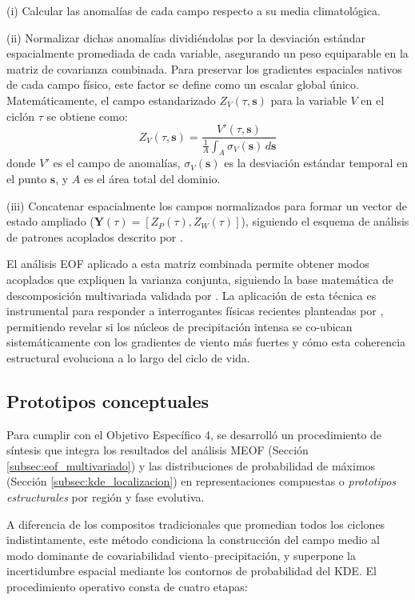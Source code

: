 (i) Calcular las anomalías de cada campo respecto a su media climatológica.

(ii) Normalizar dichas anomalías dividiéndolas por la desviación estándar espacialmente promediada de cada variable, asegurando un peso equiparable en la matriz de covarianza combinada. Para preservar los gradientes espaciales nativos de cada campo físico, este factor se define como un escalar global único. Matemáticamente, el campo estandarizado $Z_{V}(\tau, \mathbf{s})$ para la variable $V$ en el ciclón $\tau$ se obtiene como:
\begin{equation}
    Z_{V}(\tau, \mathbf{s}) = \frac{V'(\tau, \mathbf{s})}{\frac{1}{A}\int_{A} \sigma_{V}(\mathbf{s}) \, d\mathbf{s}}
\end{equation}
donde $V'$ es el campo de anomalías, $\sigma_{V}(\mathbf{s})$ es la desviación estándar temporal en el punto $\mathbf{s}$, y $A$ es el área total del dominio.

(iii) Concatenar espacialmente los campos normalizados para formar un vector de estado ampliado ($\mathbf{Y}(\tau) = [Z_P(\tau), Z_W(\tau)]$), siguiendo el esquema de análisis de patrones acoplados descrito por \citet{bretherton1992intercomparison}.

El análisis EOF aplicado a esta matriz combinada permite obtener modos acoplados que expliquen la varianza conjunta, siguiendo la base matemática de descomposición multivariada validada por \citet{liang2018multivariate}. La aplicación de esta técnica es instrumental para responder a interrogantes físicas recientes planteadas por \citet{sinclair2023relationship}, permitiendo revelar si los núcleos de precipitación intensa se co-ubican sistemáticamente con los gradientes de viento más fuertes y cómo esta coherencia estructural evoluciona a lo largo del ciclo de vida.


\subsection{Prototipos conceptuales}\label{subsec:prototipos}

Para cumplir con el Objetivo Específico 4, se desarrolló un procedimiento de síntesis que integra los resultados del análisis MEOF (Sección \ref{subsec:eof_multivariado}) y las distribuciones de probabilidad de máximos (Sección \ref{subsec:kde_localizacion}) en representaciones compuestas o \textit{prototipos estructurales} por región y fase evolutiva. 

A diferencia de los compositos tradicionales que promedian todos los ciclones indistintamente, este método condiciona la construcción del campo medio al modo dominante de covariabilidad viento--precipitación, y superpone la incertidumbre espacial mediante los contornos de probabilidad del KDE. El procedimiento operativo consta de cuatro etapas:

